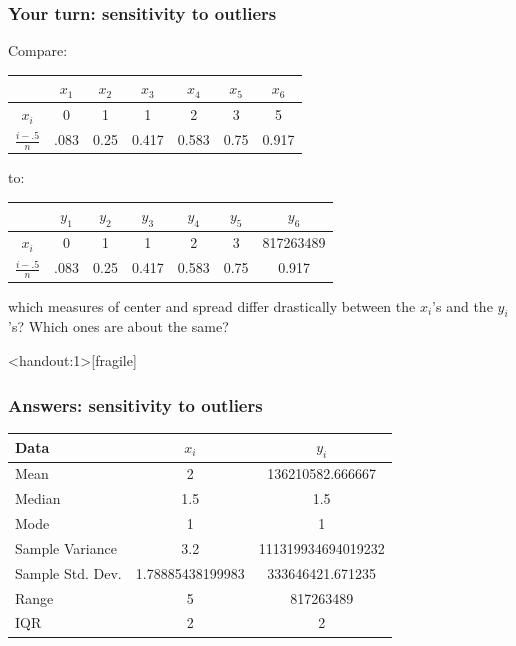 \documentclass{beamer}
\newcommand{\answers}{1}
\numberwithin{equation}{section}
\begin{document}
\begin{frame}
\frametitle{Your turn: sensitivity to outliers}

Compare:

\begin{center}
\begin{tabular}{c|cccccc}
& $x_1$ & $x_2$ & $x_3$& $x_4$ & $x_5$ & $x_6$  \\ \hline
$x_i$ & 0 & 1 & 1 & 2 & 3 & 5 \\
$\frac{i - .5}{n}$ & .083 & 0.25 & 0.417 & 0.583 & 0.75 & 0.917
\end{tabular}
\end{center} 

to:

\begin{center}
\begin{tabular}{c|cccccc}
& $y_1$ & $y_2$ & $y_3$& $y_4$ & $y_5$ & $y_6$  \\ \hline
$x_i$ & 0 & 1 & 1 & 2 & 3 & {\color{red} 817263489} \\
$\frac{i - .5}{n}$ & .083 & 0.25 & 0.417 & 0.583 & 0.75 & 0.917
\end{tabular}
\end{center} 

which measures of center and spread differ drastically between the $x_i$'s and the $y_i$'s? Which ones are about the same?

\end{frame}

\begin{frame}<handout:\answers>[fragile]
\frametitle{Answers: sensitivity to outliers}


\begin{tabular}{l|c|c}
Data & $x_i$ & $y_i$  \\ \hline
Mean & 2 &136210582.666667  \\ 
Median & 1.5 & 1.5 \\ 
Mode & 1 & 1\\ 
Sample Variance & 3.2 & 111319934694019232 \\ 
Sample Std. Dev. & 1.78885438199983 &333646421.671235 \\
Range & 5 & 817263489 \\ 
IQR & 2& 2\\ 
\end{tabular}
\end{frame}
\end{document}
